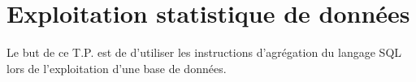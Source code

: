 \chapter{Exploitation statistique de données}
\thispagestyle{empty}
{\sf Le but de ce T.P. est de d'utiliser les instructions d'agrégation du langage SQL lors de l'exploitation d'une base de données.}
